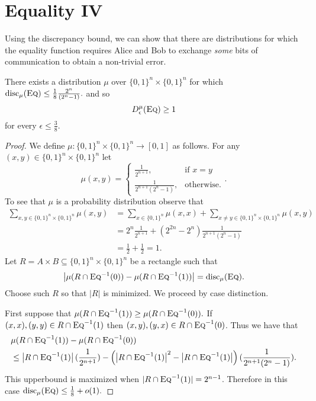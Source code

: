 \newpage \section{Equality IV}

Using the discrepancy bound, we can show that there are distributions for which the equality function requires Alice and Bob to exchange \emph{some} bits of communication to obtain a non-trivial error.

\begin{theorem}
There exists a distribution $\mu$ over $\{0,1\}^n \times \{0,1\}^n$ for which 
$
\mathrm{disc}_\mu(\textsc{Eq}) \leq \frac18 \frac{2^n}{(2^n-1)}.
$
and so
\[
D^\mu_\epsilon(\textsc{Eq}) \ge 1
\]
for every $\epsilon \le \frac38$.
\end{theorem}

\begin{proof}
    We define $\mu : \{0,1\}^n  \times \{0,1\}^n \rightarrow [0,1]$ as follows. For any $(x,y) \in \{0,1\}^n\times \{0,1\}^n$ let
    $$ \mu(x,y) = \begin{cases}
        \frac{1}{2^{n+1}}, &\text{if } x=y \\
        \frac{1}{2^{n+1}(2^n-1)}, &\text{otherwise}.
    \end{cases}.$$
    To see that $\mu$ is a probability distribution observe that
    \begin{align*}\sum_{x,y \in \{0,1\}^n\times \{0,1\}^n} \mu(x,y) &= \sum_{x\in\{0,1\}^n}\mu(x,x) + \sum_{x\neq y \in \{0,1\}^n\times \{0,1\}^n} \mu(x,y)\\
     &= 2^n \frac{1}{2^{n+1}} + (2^{2n}-2^n)\frac{1}{2^{n+1}(2^n-1)}\\
    &= \frac{1}{2} + \frac{1}{2} = 1.
    \end{align*}
    Let $R = A\times B \subseteq \{0,1\}^n\times\{0,1\}^n$ be a rectangle such that
    $$\left|\mu(R\cap \textsc{Eq}^{-1}(0)) - \mu(R\cap \textsc{Eq}^{-1}(1))\right| = \mathrm{disc}_\mu(\textsc{Eq}).$$
    Choose such $R$ so that $|R|$ is minimized. We proceed by case distinction. 
    
    First suppose that $\mu(R\cap \textsc{Eq}^{-1}(1)) \geq \mu(R\cap \textsc{Eq}^{-1}(0)).$ If $(x,x), (y,y) \in R\cap \textsc{Eq}^{-1}(1)$ then $(x,y), (y,x) \in R\cap \textsc{Eq}^{-1}(0)$. Thus we have that 
    \begin{align*}&\mu(R\cap \textsc{Eq}^{-1}(1)) - \mu(R\cap \textsc{Eq}^{-1}(0))\\ 
        &\leq \left|R\cap \textsc{Eq}^{-1}(1)\right|(\frac{1}{2^{n+1}})-\left(\left|R\cap \textsc{Eq}^{-1}(1)\right|^2-\left|R\cap \textsc{Eq}^{-1}(1)\right|\right)(\frac{1}{2^{n+1}(2^n-1)}).
    \end{align*}
    This upperbound is maximized when $|R\cap \textsc{Eq}^{-1}(1)|=2^{n-1}$. Therefore in this case $\mathrm{disc}_\mu(\textsc{Eq}) \leq \frac{1}{8} + o(1).$
    

\end{proof}
